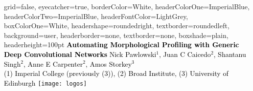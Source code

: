 \documentclass[a0paper,portrait]{baposter}
\begin{document}


\begin{poster}{
  grid=false,
  eyecatcher=true, 
  borderColor=White,
  headerColorOne=ImperialBlue,
  headerColorTwo=ImperialBlue,
  headerFontColor=LightGrey,
  boxColorOne=White,
  headershape=roundedright,
  textborder=roundedleft,
  background=user,
  headerborder=none, 
  textborder=none,
  boxshade=plain,
  headerheight=100pt
}
{
}
{
  {\sf\bf \textcolor{Black}{Automating Morphological Profiling with Generic Deep Convolutional Networks}}
  \vspace{3pt} %
} 
{
  \textcolor{Black}{Nick Pawlowski$^{1}$, Juan C Caicedo$^{2}$, Shantanu Singh$^{2}$, Anne E Carpenter$^{2}$, Amos Storkey$^{3}$}\\
  \vspace{3pt} \smaller[2] \textcolor{Black}{(1) Imperial College (previously (3)), (2) Broad Institute, (3) University of Edinburgh}
}
{
  \texttt{[image: logos]}
}

\end{poster}
\end{document}
